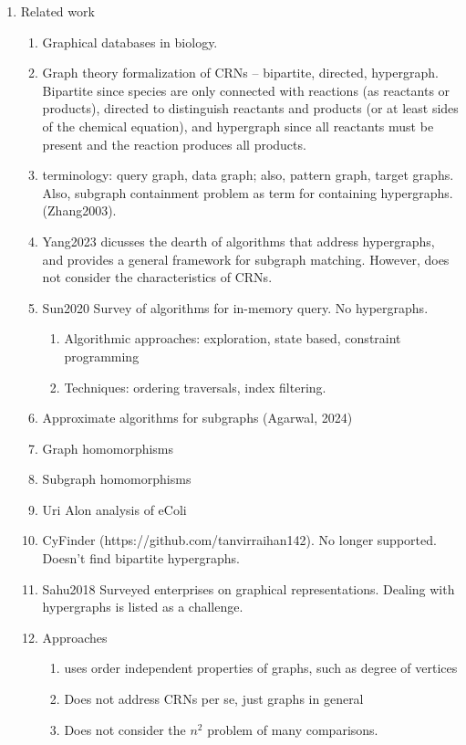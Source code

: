 \documentclass{article}
\begin{document}
\begin{enumerate}
    \item Related work
    \begin{enumerate}
        \item Graphical databases in biology.
        \item Graph theory formalization of CRNs -- bipartite, directed, hypergraph. Bipartite since species are only connected with reactions (as reactants or products), directed to distinguish reactants and products (or at least sides of the chemical equation), and hypergraph since all reactants must be present and the reaction produces all products.
        \item terminology: query graph, data graph; also, pattern graph, target graphs. Also, subgraph containment problem as term for containing hypergraphs.  (Zhang2003).
        \item Yang2023 dicusses the dearth of algorithms that address hypergraphs, and provides a general framework for subgraph matching. However, does not consider the characteristics of CRNs.
        \item Sun2020 Survey of algorithms for in-memory query. No hypergraphs.
        \begin{enumerate}
            \item Algorithmic approaches: exploration, state based, constraint programming
            \item Techniques: ordering traversals, index filtering.
        \end{enumerate}
        \item Approximate algorithms for subgraphs (Agarwal, 2024)
        \item Graph homomorphisms
        \item Subgraph homomorphisms
        \item Uri Alon analysis of eColi
        \item CyFinder (https://github.com/tanvirraihan142). No longer supported. Doesn't find bipartite hypergraphs.
        \item Sahu2018 Surveyed enterprises on graphical representations. Dealing with hypergraphs is listed as a challenge.
        \item Approaches
        \begin{enumerate}
            \item uses order independent properties of graphs, such as degree of vertices
            \item Does not address CRNs per se, just graphs in general
            \item Does not consider the $n^2$ problem of many comparisons.

\end{enumerate}
\end{enumerate}
\end{enumerate}
\end{document}
